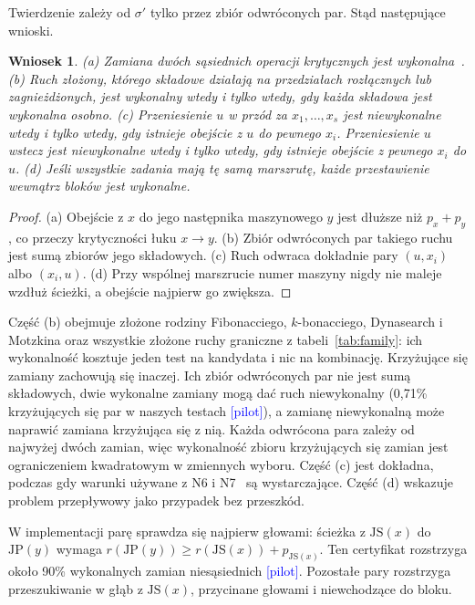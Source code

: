 \documentclass[10pt,twocolumn]{article}
\newtheorem{corollary}{Wniosek}
\newcommand{\pilot}{\textcolor{blue}{[pilot]}}
\newcommand{\JP}{\mathrm{JP}}
\newcommand{\JS}{\mathrm{JS}}
\begin{document}
Twierdzenie zależy od $\sigma'$ tylko przez zbiór odwróconych par. Stąd
następujące wnioski.

\begin{corollary}\label{co:all}
(a) Zamiana dwóch sąsiednich operacji krytycznych jest
wykonalna~\cite{laarhoven1992}.
(b) Ruch złożony, którego składowe działają na przedziałach rozłącznych
lub zagnieżdżonych, jest wykonalny wtedy i tylko wtedy, gdy każda
składowa jest wykonalna osobno.
(c) Przeniesienie $u$ w przód za $x_1,\dots,x_s$ jest niewykonalne wtedy
i tylko wtedy, gdy istnieje obejście z $u$ do pewnego $x_i$.
Przeniesienie $u$ wstecz jest niewykonalne wtedy i tylko wtedy, gdy
istnieje obejście z pewnego $x_i$ do $u$.
(d) Jeśli wszystkie zadania mają tę samą marszrutę, każde przestawienie
wewnątrz bloków jest wykonalne.
\end{corollary}
\begin{proof}
(a) Obejście z $x$ do jego następnika maszynowego $y$ jest dłuższe niż
$p_x+p_y$, co przeczy krytyczności łuku $x\to y$. (b) Zbiór odwróconych
par takiego ruchu jest sumą zbiorów jego składowych. (c) Ruch odwraca
dokładnie pary $(u,x_i)$ albo $(x_i,u)$. (d) Przy wspólnej marszrucie
numer maszyny nigdy nie maleje wzdłuż ścieżki, a obejście najpierw go
zwiększa.
\end{proof}

Część (b) obejmuje złożone rodziny Fibonacciego, $k$-bonacciego,
Dynasearch i Motzkina oraz wszystkie złożone ruchy graniczne
z tabeli~\ref{tab:family}: ich wykonalność kosztuje jeden test na
kandydata i nic na kombinację. Krzyżujące się zamiany zachowują się
inaczej. Ich zbiór odwróconych par nie jest sumą składowych, dwie
wykonalne zamiany mogą dać ruch niewykonalny (0,71\% krzyżujących się par
w naszych testach \pilot), a zamianę niewykonalną może naprawić zamiana
krzyżująca się z nią. Każda odwrócona para zależy od najwyżej dwóch
zamian, więc wykonalność zbioru krzyżujących się zamian jest ograniczeniem
kwadratowym w zmiennych wyboru. Część (c) jest dokładna, podczas gdy
warunki używane z N6 i N7~\cite{balas1998,zhang2007} są wystarczające.
Część (d) wskazuje problem przepływowy jako przypadek bez przeszkód.

W implementacji parę sprawdza się najpierw głowami: ścieżka z $\JS(x)$
do $\JP(y)$ wymaga $r(\JP(y))\ge r(\JS(x))+p_{\JS(x)}$. Ten certyfikat
rozstrzyga około 90\% wykonalnych zamian niesąsiednich \pilot. Pozostałe
pary rozstrzyga przeszukiwanie w głąb z $\JS(x)$, przycinane głowami
i niewchodzące do bloku.

\end{document}
